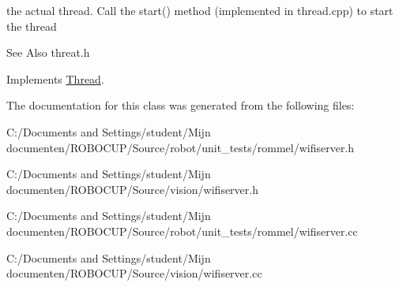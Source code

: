 the actual thread. Call the start() method (implemented in thread.\-cpp) to start the thread 

\begin{DoxySeeAlso}{See Also}
threat.\-h 
\end{DoxySeeAlso}


Implements \hyperlink{class_thread}{Thread}.



The documentation for this class was generated from the following files\-:\begin{DoxyCompactItemize}
\item 
C\-:/\-Documents and Settings/student/\-Mijn documenten/\-R\-O\-B\-O\-C\-U\-P/\-Source/robot/unit\-\_\-tests/rommel/wifiserver.\-h\item 
C\-:/\-Documents and Settings/student/\-Mijn documenten/\-R\-O\-B\-O\-C\-U\-P/\-Source/vision/wifiserver.\-h\item 
C\-:/\-Documents and Settings/student/\-Mijn documenten/\-R\-O\-B\-O\-C\-U\-P/\-Source/robot/unit\-\_\-tests/rommel/wifiserver.\-cc\item 
C\-:/\-Documents and Settings/student/\-Mijn documenten/\-R\-O\-B\-O\-C\-U\-P/\-Source/vision/wifiserver.\-cc\end{DoxyCompactItemize}
